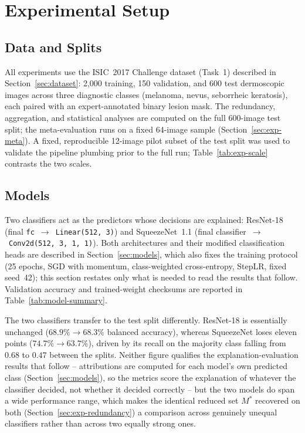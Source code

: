 \section{Experimental Setup}
\label{sec:exp-setup}

\subsection{Data and Splits}

All experiments use the ISIC~2017 Challenge dataset (Task~1) described in
Section~\ref{sec:dataset}: 2{,}000 training, 150 validation, and 600 test
dermoscopic images across three diagnostic classes (melanoma, nevus,
seborrheic keratosis), each paired with an expert-annotated binary lesion
mask. The redundancy, aggregation, and statistical analyses are computed on
the full 600-image test split; the meta-evaluation runs on a fixed 64-image
sample (Section~\ref{sec:exp-meta}). A fixed, reproducible
12-image pilot subset of the test split was used to validate the pipeline
plumbing prior to the full run; Table~\ref{tab:exp-scale} contrasts the two
scales.

\subsection{Models}

Two classifiers act as the predictors whose decisions are explained: ResNet-18
(final \texttt{fc}~$\to$~\texttt{Linear(512, 3)}) and SqueezeNet~1.1 (final
classifier~$\to$~\texttt{Conv2d(512, 3, 1, 1)}). Both architectures and their
modified classification heads are described in Section~\ref{sec:models},
which also fixes the training protocol (25 epochs, SGD with momentum,
class-weighted cross-entropy, StepLR, fixed seed~42); this section restates
only what is needed to read the results that follow. Validation accuracy and
trained-weight checksums are reported in Table~\ref{tab:model-summary}.

The two classifiers transfer to the test split differently. ResNet-18 is
essentially unchanged ($68.9\% \to 68.3\%$ balanced accuracy), whereas
SqueezeNet loses eleven points ($74.7\% \to 63.7\%$), driven by its recall
on the majority class falling from $0.68$ to $0.47$ between the splits.
Neither figure qualifies the explanation-evaluation results that
follow -- attributions are computed for each model's own predicted class
(Section~\ref{sec:models}), so the metrics score the explanation of whatever
the classifier decided, not whether it decided correctly -- but the two
models do span a wide performance range, which makes the identical reduced
set $M^{*}$ recovered on both (Section~\ref{sec:exp-redundancy}) a
comparison across genuinely unequal classifiers rather than across two
equally strong ones.

